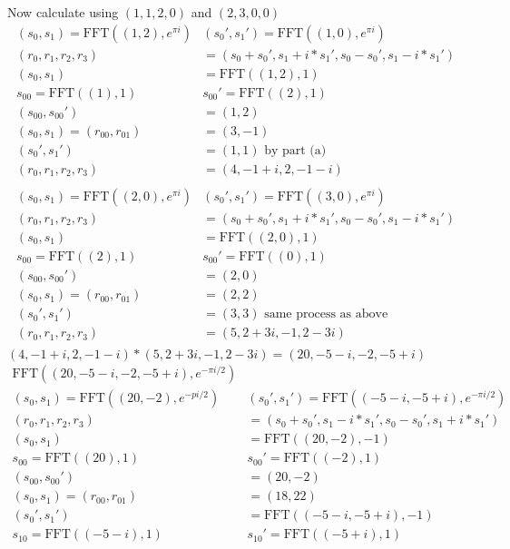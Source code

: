 \documentclass[11pt]{article}
\begin{document}
\begin{enumerate}
\begin{enumerate}
Now calculate using $(1,1,2,0)$ and $(2,3,0,0)$
\begin{align*}
(s_0,s_1)=\text{FFT}((1,2), e^{\pi i})&(s_0',s_1')=\text{FFT}((1,0), e^{\pi i})\\
(r_0,r_1,r_2,r_3)&=(s_0+s_0',s_1+i*s_1',s_0-s_0',s_1-i*s_1')\\
(s_0,s_1)&=\text{FFT}((1,2), 1)\\
s_{00}=\text{FFT}((1),1)&s_{00}'=\text{FFT}((2),1)\\
(s_{00},s_{00}')&=(1,2)\\
(s_0,s_1)=(r_{00},r_{01})&=(3,-1)\\
(s_0',s_1')&=(1,1)\text{ by part (a)}\\ 
(r_0,r_1,r_2,r_3)&=(4,-1+i,2,-1-i)\\
\end{align*}
\begin{align*}
(s_0,s_1)=\text{FFT}((2,0), e^{\pi i})&(s_0',s_1')=\text{FFT}((3,0), e^{\pi i})\\
(r_0,r_1,r_2,r_3)&=(s_0+s_0',s_1+i*s_1',s_0-s_0',s_1-i*s_1')\\
(s_0,s_1)&=\text{FFT}((2,0), 1)\\
s_{00}=\text{FFT}((2),1)&s_{00}'=\text{FFT}((0),1)\\
(s_{00},s_{00}')&=(2,0)\\
(s_0,s_1)=(r_{00},r_{01})&=(2,2)\\
(s_0',s_1')&=(3,3)\text{ same process as above}\\ 
(r_0,r_1,r_2,r_3)&=(5,2+3i,-1,2-3i)\\
\end{align*}
$(4,-1+i,2,-1-i)*(5,2+3i,-1,2-3i)=(20,-5-i,-2,-5+i)$\\
\begin{align*}
\text{FFT}((20,-5-i,-2,-5+i), e^{- \pi i/2})\\
(s_0,s_1)=\text{FFT}((20,-2), e^{-pi / 2})&(s_0',s_1')=\text{FFT}((-5-i,-5+i), e^{-\pi i/2})\\
(r_0,r_1,r_2,r_3)&=(s_0+s_0',s_1-i*s_1',s_0-s_0',s_1+i*s_1')\\
(s_0, s_1)&=\text{FFT}((20,-2), -1)\\
s_{00}=\text{FFT}((20), 1)&s_{00}'=\text{FFT}((-2),1)\\
(s_{00},s_{00}')&=(20,-2)\\
(s_0,s_1)=(r_{00},r_{01})&=(18,22)\\
(s_0', s_1')&=\text{FFT}((-5-i,-5+i), -1)\\
s_{10}=\text{FFT}((-5-i), 1)&s_{10}'=\text{FFT}((-5+i),1)\\

\end{align*}
\end{enumerate}
\end{enumerate}
\end{document}
